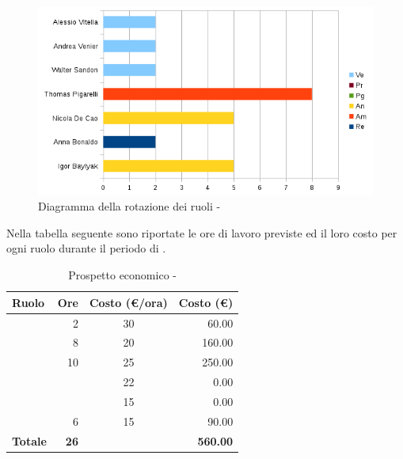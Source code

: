 \documentclass[12pt,a4paper]{article}
\begin{document}
\begin{center}
	\begin{figure}[H]
		\centering	
		\includegraphics[width=\textwidth]{../img/diagrammaBarreAnalisiDiDettaglioRotazioneRuoli.png}
		\caption{Diagramma della rotazione dei ruoli - \FAD{}}
	\end{figure}
\end{center}

\newpage
{}
Nella tabella seguente sono riportate le ore di lavoro previste ed il loro costo per ogni ruolo durante il periodo di \FAD{}.

\begin{table}[H]
	\begin{center}
		\begin{tabular}{l r c r}
			\toprule
			\textbf{Ruolo}	& \textbf{Ore} & \textbf{Costo (\euro/ora)}	& \textbf{Costo (\euro)} \\ \midrule
			\midrule
			\RE{} & 2 & 30 & 60.00 \\ \midrule
			\AM{} & 8 & 20 & 160.00 \\ \midrule
			\AN{} & 10 & 25 & 250.00 \\ \midrule
			\PG{} & & 22 & 0.00 \\ \midrule
			\PR{} & & 15 & 0.00 \\ \midrule
			\VR{} & 6 & 15 & 90.00 \\ \midrule
			\textbf{Totale} & \textbf{26} &  & \textbf{560.00} \\
			\bottomrule
		\end{tabular}
		\caption{Prospetto economico - \FAD{}}
	\end{center}
\end{table}
\end{document}
